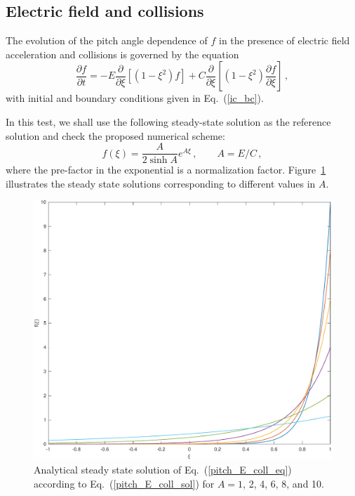 \documentclass[preprint,11pt]{elsarticle}
\newcommand{\bq}{\begin{equation}}
\newcommand{\eq}{\end{equation}}
\begin{document}
\subsection{Electric field and collisions}\label{SubSect:Pitch-4}
The evolution of the pitch angle dependence of $f$ in the presence of electric field acceleration and collisions is governed by the equation
\bq
\label{pitch_E_coll_eq}
\frac{\partial f}{\partial t}= 
- E \frac{\partial}{\partial\xi} \left[ \left(1-\xi^2\right) f \right] + C \frac{\partial}{\partial\xi} \left[ \left(1-\xi^2\right) \frac{\partial f}{\partial \xi} \right]\, ,
\eq
with initial and boundary conditions given in Eq.~(\ref{ic_bc}).
%

 In this test, we shall use the following steady-state solution as the reference solution and check the proposed numerical scheme:
\bq
\label{pitch_E_coll_sol}
f(\xi)=\frac{A}{2 \sinh A} e^{A \xi}\, , \qquad A=E/C \, ,
\eq
where the pre-factor in the exponential is a normalization factor. Figure~\ref{fig_pitch_E_coll} illustrates the steady state solutions corresponding to different values in $A$.
\begin{figure}[H]
\begin{center}
\includegraphics[scale=0.35]{FIGURES/fig_E_coll_std-eps-converted-to}
\end{center}
\caption{Analytical steady state solution of Eq.~(\ref{pitch_E_coll_eq}) according to Eq.~(\ref{pitch_E_coll_sol}) for $A=1$, 2, 4, 6, 8, and 10.}\label{fig_pitch_E_coll}
\end{figure}
\end{document}
